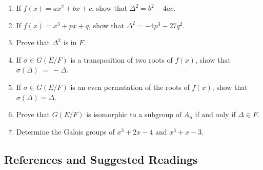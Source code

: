 {\begin{enumerate}
\begin{enumerate}
 \item
If $f(x) = a x^2 + b x + c$, show that $\Delta^2 = b^2 - 4ac$.
 
 \item
If $f(x) = x^3 + p x + q$, show that $\Delta^2 = - 4p^3 - 27q^2$.
 
 \item
Prove that $\Delta^2$ is in $F$.
 
 \item
If $\sigma \in G(E/F)$ is a transposition of two roots of $f(x)$, show
that $\sigma( \Delta )~=~-\Delta$.
 
  \item
If $\sigma \in G(E/F)$ is an even permutation of the roots of $f(x)$, show
that $\sigma( \Delta ) = \Delta$.
 
  \item
Prove that $G(E/F)$ is isomorphic to a subgroup of $A_n$ if and
only if $\Delta \in F$.
 
 \item
Determine the Galois groups of $x^3 + 2 x - 4$ and $x^3 + x -3$.
 
\end{enumerate}
 
 
\end{enumerate}
}
 
 
 
 
\subsection*{References and Suggested Readings}
 

